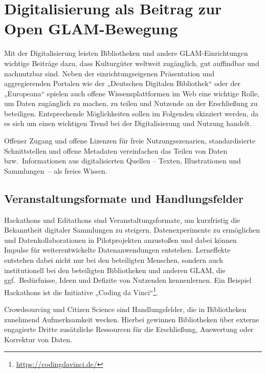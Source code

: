 \documentclass[
  11pt,
  letterpaper,
  DIV=11,
  twoside]{scrreprt}
\DeclareRobustCommand{\href}[2]{#2\footnote{\url{#1}}}
\begin{document}
\section{Digitalisierung als Beitrag zur Open
GLAM-Bewegung}\label{digitalisierung-als-beitrag-zur-open-glam-bewegung}

Mit der Digitalisierung leisten Bibliotheken und andere
GLAM-Einrichtungen wichtige Beiträge dazu, dass Kulturgüter weltweit
zugänglich, gut auffindbar und nachnutzbar sind. Neben der
einrichtungseigenen Präsentation und aggregierenden Portalen wie der
„Deutschen Digitalen Bibliothek`` oder der „Europeana`` spielen auch
offene Wissensplattformen im Web eine wichtige Rolle, um Daten
zugänglich zu machen, zu teilen und Nutzende an der Erschließung zu
beteiligen. Entsprechende Möglichkeiten sollen im Folgenden skizziert
werden, da es sich um einen wichtigen Trend bei der Digitalisierung und
Nutzung handelt.

Offener Zugang und offene Lizenzen für freie Nutzungsszenarien,
standardisierte Schnittstellen und offene Metadaten vereinfachen das
Teilen von Daten bzw.~Informationen aus digitalisierten Quellen --
Texten, Illustrationen und Sammlungen~-- als freies Wissen.

\subsection{Veranstaltungsformate und
Handlungsfelder}\label{veranstaltungsformate-und-handlungsfelder}

Hackathons und Editathons sind Veranstaltungsformate, um kurzfristig die
Bekanntheit digitaler Sammlungen zu steigern, Datenexperimente zu
ermöglichen und Datenkollaborationen in Pilotprojekten anzustoßen und
dabei können Impulse für weiterentwickelte Datenanwendungen entstehen.
Lerneffekte entstehen dabei nicht nur bei den beteiligten Menschen,
sondern auch institutionell bei den beteiligten Bibliotheken und anderen
GLAM, die ggf.~Bedürfnisse, Ideen und Defizite von Nutzenden
kennenlernen. Ein Beispiel Hackathons ist die Initiative
\href{https://codingdavinci.de/}{„Coding da Vinci``}.

Crowdsourcing und Citizen Science sind Handlungsfelder, die in
Bibliotheken zunehmend Aufmerksamkeit wecken. Hierbei gewinnen
Bibliotheken über externe engagierte Dritte zusätzliche Ressourcen für
die Erschließung, Auswertung oder Korrektur von Daten.
\end{document}
